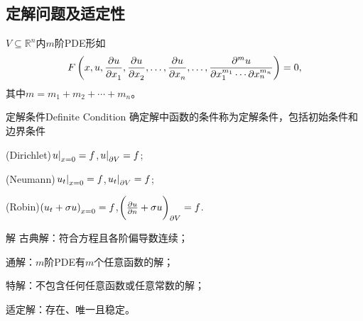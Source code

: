 \iffalse
	\begin{example}{Maxwell方程组}{}
		电动力学中
		\begin{align*}
			\nabla\cdot\bm D  & =\rho,              \\
			\nabla\cdot\bm B  & =0,                 \\
			\nabla\times\bm E & =-\pv{\bm B}t,      \\
			\nabla\times\bm H & =\bm J+\pv{\bm D}t.
		\end{align*}
	\end{example}
\fi
\subsection{定解问题及适定性}
$V\subseteq\mathbb R^n$内$m$阶PDE形如
\[
	F\kh{x,u,\pv u{x_1},\pv u{x_2},\ldots,\pv u{x_n},\ldots,\frac{\p^mu}{\p x_1^{m_1}\cdots\p x_n^{m_n}}}=0,
\]
其中$m=m_1+m_2+\cdots+m_n$。
\begin{definition}{定解条件}{Definite Condition}
	确定解中函数的条件称为定解条件，包括初始条件和边界条件
	\begin{compactenum}[I.]
		\item (Dirichlet)\quad$\left.u\right\rvert_{x=0}=f$,\qqqquad$\left.u\right\rvert_{\partial V}=f$;
		\item (Neumann)\enspace$\left.u_t\right\rvert_{x=0}=f$,\qqqquad\!$\left.u_t\right\rvert_{\partial V}=f$;
		\item (Robin)\qquad$\left(u_t+\sigma u\right)_{x=0}=f$,\quad$\biggl(\frac{\partial^{\;\!\!}u}{\partial n^{\;\!\!}}+\sigma u\biggr)_{\partial V}=f$.
	\end{compactenum}
\end{definition}
\begin{definition}{解}{}
	古典解：符合方程且各阶偏导数连续；

	通解：$m$阶PDE有$m$个任意函数的解；

	特解：不包含任何任意函数或任意常数的解；

	适定解：存在、唯一且稳定。
\end{definition}
